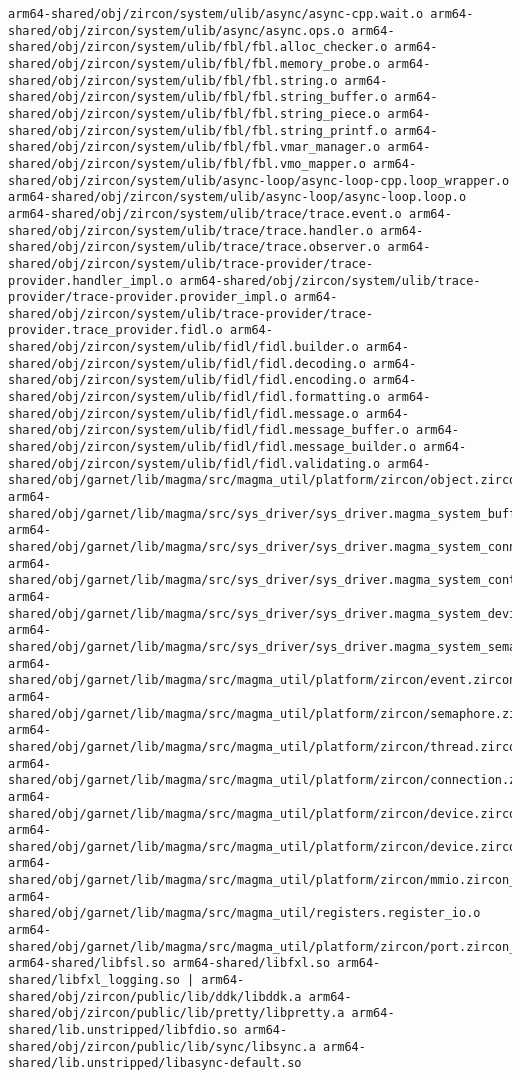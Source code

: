 \begin{verbatim}
arm64-shared/obj/zircon/system/ulib/async/async-cpp.wait.o arm64-shared/obj/zircon/system/ulib/async/async.ops.o arm64-shared/obj/zircon/system/ulib/fbl/fbl.alloc_checker.o arm64-shared/obj/zircon/system/ulib/fbl/fbl.memory_probe.o arm64-shared/obj/zircon/system/ulib/fbl/fbl.string.o arm64-shared/obj/zircon/system/ulib/fbl/fbl.string_buffer.o arm64-shared/obj/zircon/system/ulib/fbl/fbl.string_piece.o arm64-shared/obj/zircon/system/ulib/fbl/fbl.string_printf.o arm64-shared/obj/zircon/system/ulib/fbl/fbl.vmar_manager.o arm64-shared/obj/zircon/system/ulib/fbl/fbl.vmo_mapper.o arm64-shared/obj/zircon/system/ulib/async-loop/async-loop-cpp.loop_wrapper.o arm64-shared/obj/zircon/system/ulib/async-loop/async-loop.loop.o arm64-shared/obj/zircon/system/ulib/trace/trace.event.o arm64-shared/obj/zircon/system/ulib/trace/trace.handler.o arm64-shared/obj/zircon/system/ulib/trace/trace.observer.o arm64-shared/obj/zircon/system/ulib/trace-provider/trace-provider.handler_impl.o arm64-shared/obj/zircon/system/ulib/trace-provider/trace-provider.provider_impl.o arm64-shared/obj/zircon/system/ulib/trace-provider/trace-provider.trace_provider.fidl.o arm64-shared/obj/zircon/system/ulib/fidl/fidl.builder.o arm64-shared/obj/zircon/system/ulib/fidl/fidl.decoding.o arm64-shared/obj/zircon/system/ulib/fidl/fidl.encoding.o arm64-shared/obj/zircon/system/ulib/fidl/fidl.formatting.o arm64-shared/obj/zircon/system/ulib/fidl/fidl.message.o arm64-shared/obj/zircon/system/ulib/fidl/fidl.message_buffer.o arm64-shared/obj/zircon/system/ulib/fidl/fidl.message_builder.o arm64-shared/obj/zircon/system/ulib/fidl/fidl.validating.o arm64-shared/obj/garnet/lib/magma/src/magma_util/platform/zircon/object.zircon_platform_object.o arm64-shared/obj/garnet/lib/magma/src/sys_driver/sys_driver.magma_system_buffer.o arm64-shared/obj/garnet/lib/magma/src/sys_driver/sys_driver.magma_system_connection.o arm64-shared/obj/garnet/lib/magma/src/sys_driver/sys_driver.magma_system_context.o arm64-shared/obj/garnet/lib/magma/src/sys_driver/sys_driver.magma_system_device.o arm64-shared/obj/garnet/lib/magma/src/sys_driver/sys_driver.magma_system_semaphore.o arm64-shared/obj/garnet/lib/magma/src/magma_util/platform/zircon/event.zircon_platform_event.o arm64-shared/obj/garnet/lib/magma/src/magma_util/platform/zircon/semaphore.zircon_platform_semaphore.o arm64-shared/obj/garnet/lib/magma/src/magma_util/platform/zircon/thread.zircon_platform_thread.o arm64-shared/obj/garnet/lib/magma/src/magma_util/platform/zircon/connection.zircon_platform_connection.o arm64-shared/obj/garnet/lib/magma/src/magma_util/platform/zircon/device.zircon_platform_device.o arm64-shared/obj/garnet/lib/magma/src/magma_util/platform/zircon/device.zircon_platform_pci_device.o arm64-shared/obj/garnet/lib/magma/src/magma_util/platform/zircon/mmio.zircon_platform_mmio.o arm64-shared/obj/garnet/lib/magma/src/magma_util/registers.register_io.o arm64-shared/obj/garnet/lib/magma/src/magma_util/platform/zircon/port.zircon_platform_port.o arm64-shared/libfsl.so arm64-shared/libfxl.so arm64-shared/libfxl_logging.so | arm64-shared/obj/zircon/public/lib/ddk/libddk.a arm64-shared/obj/zircon/public/lib/pretty/libpretty.a arm64-shared/lib.unstripped/libfdio.so arm64-shared/obj/zircon/public/lib/sync/libsync.a arm64-shared/lib.unstripped/libasync-default.so 
\end{verbatim}
